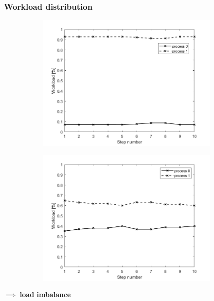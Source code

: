 \documentclass{beamer}
\begin{document}
\begin{frame} %
	\frametitle{Workload distribution}
	\begin{figure}
		\begin{subfigure}{.5\textwidth}
			\includegraphics[width=\linewidth]{etc/test5_1.jpeg}
		\end{subfigure}%
		\begin{subfigure}{.5\textwidth}
			\includegraphics[width=\linewidth]{etc/test6_1.jpeg}
		\end{subfigure}
	\end{figure}
\begin{center}
	\vspace{16pt}
	$\implies$ \textbf{load imbalance}
\end{center}
\end{frame}
\end{document}
